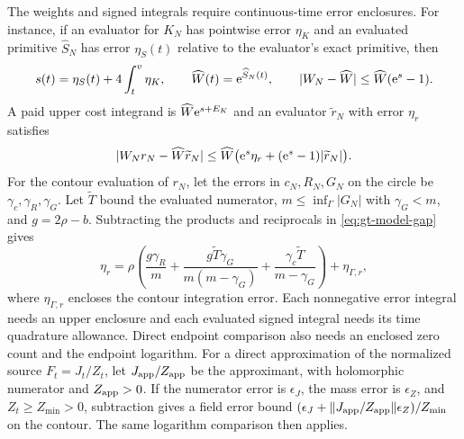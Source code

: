 The weights and signed integrals require continuous-time error
enclosures. For instance, if an evaluator for \(K_N\) has pointwise
error \(\eta_K\) and an evaluated primitive \(\widehat S_N\) has
error \(\eta_S(t)\) relative to the evaluator's exact primitive, then
\[
 s(t)=\eta_S(t)+4\int_t^v\eta_K,\qquad
 \widehat W(t)=\mathrm e^{\widehat S_N(t)},\qquad
 |W_N-\widehat W|\le\widehat W(\mathrm e^s-1).
\]
A paid upper cost integrand is \(\widehat W\mathrm e^{s+E_K}\) and an
evaluator \(\widetilde r_N\) with error \(\eta_r\) satisfies
\[
 |W_Nr_N-\widehat W\widetilde r_N|
 \le \widehat W\big(\mathrm e^s\eta_r+(\mathrm e^s-1)|\widetilde r_N|\big).
\]
For the contour evaluation of \(r_N\), let the errors in \(c_N,R_N,G_N\)
on the circle be \(\gamma_c,\gamma_R,\gamma_G\). Let \(\widetilde T\)
bound the evaluated numerator, \(m\le\inf_\Gamma|G_N|\) with
\(\gamma_G<m\), and \(g=2\rho-b\). Subtracting the products and
reciprocals in \eqref{eq:gt-model-gap} gives
\[
 \eta_r=
 \rho\left(\frac{g\gamma_R}{m}
 +\frac{g\widetilde T\gamma_G}{m(m-\gamma_G)}
 +\frac{\gamma_c\widetilde T}{m-\gamma_G}\right)+\eta_{\Gamma,r},
\]
where \(\eta_{\Gamma,r}\) encloses the contour integration error.
Each nonnegative error integral needs an upper enclosure and each
evaluated signed integral needs its time quadrature allowance.
Direct endpoint comparison also needs an enclosed zero count and
the endpoint logarithm. For a direct approximation of the normalized
source \(F_t=J_t/Z_t\), let \(J_{\rm app}/Z_{\rm app}\) be the
approximant, with holomorphic numerator and \(Z_{\rm app}>0\).
If the numerator error is \(\epsilon_J\), the mass error is
\(\epsilon_Z\), and \(Z_t\ge Z_{\min}>0\), subtraction gives a
field error bound
\((\epsilon_J+\|J_{\rm app}/Z_{\rm app}\|\epsilon_Z)/Z_{\min}\)
on the contour. The same logarithm comparison then applies.

